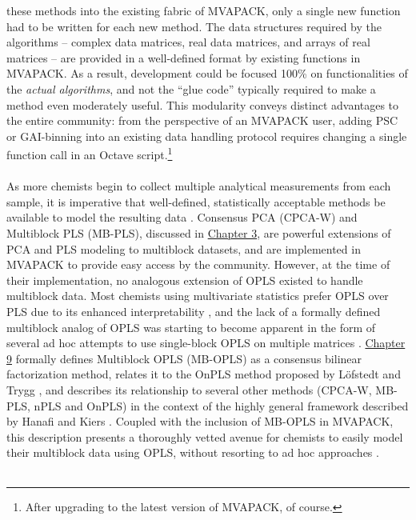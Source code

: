 \begin{doublespace}
these methods into the existing fabric of MVAPACK, only a single new
function had to be written for each new method. The data structures
required by the algorithms -- complex data matrices, real data matrices,
and arrays of real matrices -- are provided in a well-defined format by
existing functions in MVAPACK. As a result, development could be focused
100\% on functionalities of the \emph{actual algorithms}, and not the
``glue code'' typically required to make a method even moderately useful.
This modularity conveys distinct advantages to the entire community:
from the perspective of an MVAPACK user, adding PSC or GAI-binning into
an existing data handling protocol requires changing a single function
call in an Octave script.\footnote{After upgrading to the latest version
of MVAPACK, of course.}
\\\\
As more chemists begin to collect multiple analytical measurements from each
sample, it is imperative that well-defined, statistically acceptable methods
be available to model the resulting data \cite{westerhuis:jchemo1997,
  westerhuis:jchemo1998,smilde:jchemo2003,
  marshall:metab2015,worley:jchemo2015}. Consensus PCA (CPCA-W) and Multiblock
PLS (MB-PLS), discussed in \hyperlink{chapter.3}{Chapter 3}, are powerful
extensions of PCA and PLS modeling to multiblock datasets, and are implemented
in MVAPACK to provide easy access by the community. However, at the time of
their implementation, no analogous extension of OPLS existed to handle
multiblock data. Most chemists using multivariate statistics prefer OPLS
over PLS due to its enhanced
interpretability \cite{trygg:jchemo2002,tapp:trac2009}, and the lack of
a formally defined multiblock analog of OPLS was starting to become apparent
in the form of several ad hoc attempts to use single-block OPLS on multiple
matrices \cite{bylesjo:jpr2009,boccard:aca2013}.
\hyperlink{chapter.9}{Chapter 9} formally defines Multiblock OPLS (MB-OPLS)
as a consensus bilinear factorization method, relates it to the OnPLS method
proposed by L\"{o}fstedt and Trygg \cite{lofstedt:jchemo2011}, and describes
its relationship to several other methods (CPCA-W, MB-PLS, nPLS and OnPLS)
in the context of the highly general framework described by Hanafi and Kiers
\cite{hanafi:csda2006}. Coupled with the inclusion of MB-OPLS in MVAPACK,
this description presents a thoroughly vetted avenue for chemists to easily
model their multiblock data using OPLS, without resorting to ad hoc
approaches \cite{worley:jchemo2015}.
\\\\

\end{doublespace}
